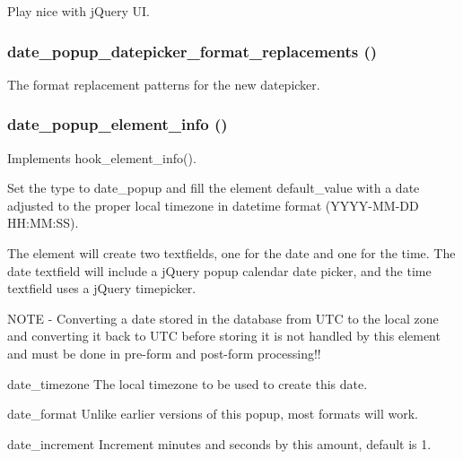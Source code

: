 Play nice with jQuery UI. \hypertarget{date__popup_8module_afe02f13cab50570420caf4d3f0a6d824}{
\subsubsection[{date\_\-popup\_\-datepicker\_\-format\_\-replacements}]{\setlength{\rightskip}{0pt plus 5cm}date\_\-popup\_\-datepicker\_\-format\_\-replacements ()}}
\label{date__popup_8module_afe02f13cab50570420caf4d3f0a6d824}
The format replacement patterns for the new datepicker. \hypertarget{date__popup_8module_a0ba42c20b0a9b00949c0d480f2f67fb7}{
\subsubsection[{date\_\-popup\_\-element\_\-info}]{\setlength{\rightskip}{0pt plus 5cm}date\_\-popup\_\-element\_\-info ()}}
\label{date__popup_8module_a0ba42c20b0a9b00949c0d480f2f67fb7}
Implements hook\_\-element\_\-info().

Set the type to date\_\-popup and fill the element default\_\-value with a date adjusted to the proper local timezone in datetime format (YYYY-\/MM-\/DD HH:MM:SS).

The element will create two textfields, one for the date and one for the time. The date textfield will include a jQuery popup calendar date picker, and the time textfield uses a jQuery timepicker.

NOTE -\/ Converting a date stored in the database from UTC to the local zone and converting it back to UTC before storing it is not handled by this element and must be done in pre-\/form and post-\/form processing!!

date\_\-timezone The local timezone to be used to create this date.

date\_\-format Unlike earlier versions of this popup, most formats will work.

date\_\-increment Increment minutes and seconds by this amount, default is 1.


